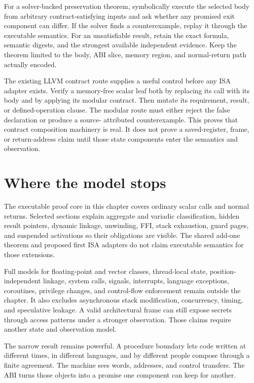 For a solver-backed preservation theorem, symbolically execute the selected
body from arbitrary contract-satisfying inputs and ask whether any promised
exit component can differ. If the solver finds a counterexample, replay it through the
executable semantics. For an unsatisfiable result, retain the exact formula,
semantic digests, and the strongest available independent evidence. Keep the
theorem limited to the body, ABI slice, memory region, and normal-return path
actually encoded.

The existing LLVM contract route supplies a useful control before any ISA
adapter exists. Verify a memory-free scalar leaf both by replacing its call
with its body and by applying its modular contract. Then mutate its
requirement, result, or defined-operation clause.
The modular route must either reject the false declaration or produce a source-
attributed counterexample. This proves that contract composition machinery is
real. It does not prove a saved-register, frame, or return-address claim until
those state components enter the semantics and observation.

\section{Where the model stops}

The executable proof core in this chapter covers ordinary scalar calls and
normal returns. Selected sections explain aggregate and variadic
classification, hidden result pointers, dynamic linkage, unwinding, FFI,
stack exhaustion, guard pages, and suspended activations so their obligations
are visible. The shared add-one theorem and proposed first ISA adapters do not
claim executable semantics for those extensions.

Full models for floating-point and vector classes, thread-local state,
position-independent linkage, system calls, signals, interrupts, language
exceptions, coroutines, privilege changes, and control-flow enforcement remain
outside the chapter. It also excludes asynchronous stack modification,
concurrency, timing, and speculative leakage. A valid architectural frame can
still expose secrets through access patterns under a stronger observation.
Those claims require another state and observation model.

The narrow result remains powerful. A procedure boundary lets code written at
different times, in different languages, and by different people compose
through a finite agreement. The machine sees words, addresses, and control
transfers. The ABI turns those objects into a promise one component can keep
for another.

